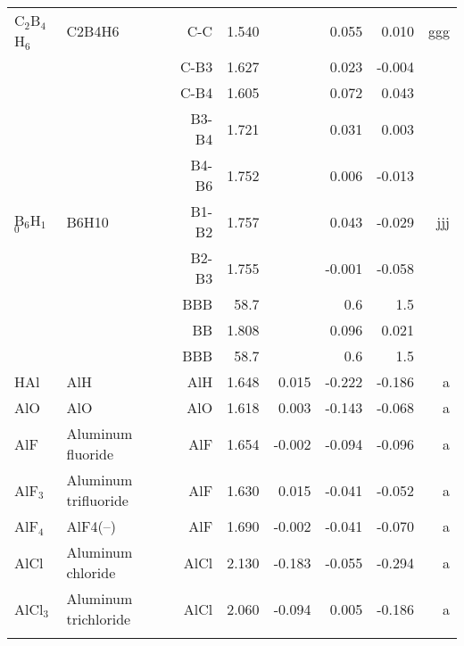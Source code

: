 \begin{table}
\begin{center}
\begin{tabular}{llrrrrrr}
 C$_2$B$_4$H$_6$      & C2B4H6                             &C-C           &     1.540   &  &     0.055 &     0.010 &   ggg \\
             &                                    &C-B3          &     1.627   &  &     0.023 &    -0.004 &       \\
             &                                    &C-B4          &     1.605   &  &     0.072 &     0.043 &       \\
             &                                    &B3-B4         &     1.721   &  &     0.031 &     0.003 &       \\
             &                                    &B4-B6         &     1.752   &  &     0.006 &    -0.013 &       \\
 B$_6$H$_1$$_0$       & B6H10                              &B1-B2         &     1.757   &  &     0.043 &    -0.029 &   jjj \\
             &                                    &B2-B3         &     1.755   &  &    -0.001 &    -0.058 &       \\
             &                                    &BBB         &      58.7   &  &       0.6 &       1.5   &       \\
             &                                    &BB            &     1.808   &  &     0.096 &     0.021 &       \\
             &                                    &BBB         &      58.7   &  &       0.6 &       1.5   &       \\
 HAl         & AlH                                &AlH           &     1.648   &     0.015 &    -0.222 &    -0.186 &     a \\
 AlO         & AlO                                &AlO           &     1.618   &     0.003 &    -0.143 &    -0.068 &     a \\
 AlF         & Aluminum fluoride                  &AlF           &     1.654   &    -0.002 &    -0.094 &    -0.096 &     a \\
 AlF$_3$        & Aluminum trifluoride               &AlF           &     1.630   &     0.015 &    -0.041 &    -0.052 &     a \\
 AlF$_4$        & AlF4(--)                            &AlF            &     1.690   &    -0.002 &    -0.041 &    -0.070 &     a \\
 AlCl        & Aluminum chloride                  &AlCl           &     2.130   &    -0.183 &    -0.055 &    -0.294 &     a \\
 AlCl$_3$       & Aluminum trichloride               &AlCl           &     2.060   &    -0.094 &     0.005 &    -0.186 &     a \\
$$
\end{tabular}
\end{center}
\end{table}
